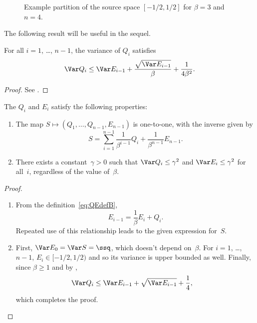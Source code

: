 \begin{figure}
  \begin{center}
    
  \end{center}
  \caption{Example partition of the source space $[-1/2,1/2]$ for $\beta = 3$
  and $n = 4$. }
  \label{fig:sourcepartition}
\end{figure}


The following result will be useful in the sequel.

\begin{lemma}
  \label{lem:Qvarbound}
  For all $i = 1$, \dots, $n-1$, the variance of $Q_i$ satisfies
  \begin{equation*}
    \Var Q_i \le \Var E_{i-1} + \frac{\sqrt{\Var E_{i-1}}}{\beta} +
    \frac{1}{4\beta^2}.
  \end{equation*}
\end{lemma}

\begin{proof}
  See .
\end{proof}

\begin{proposition}
  \label{prop:qeproperties}
  The $Q_i$ and $E_i$ satisfy the following properties:
\begin{enumerate}
  \item The map $S \mapsto (Q_1, \dots, Q_{n-1}, E_{n-1})$ is one-to-one, with
    the inverse given by
    \begin{equation}
      \label{eq:unwraprec}
      S = \sum_{i=1}^{n-1} \frac{1}{\beta^{i-1}} Q_i + \frac{1}{\beta^{n-1}}
      E_{n-1}.
    \end{equation}

  \item There exists a constant~$\gamma > 0$ such that $\Var Q_i \le \gamma^2$
    and $\Var E_i \le \gamma^2$ for all~$i$, regardless of the value of~$\beta$.
\end{enumerate}
\end{proposition}

\begin{proof}
  \begin{enumerate}
    \item From the definition~\eqref{eq:QEdefB}, 
    \begin{equation}
      \label{eq:reverserec}
      E_{i-1} = \frac{1}{\beta} E_i + Q_i.
    \end{equation}
    Repeated use of this relationship leads to the given expression for~$S$. 

  \item First, $\Var E_0 = \Var S = \ssq$, which doesn't depend
    on~$\beta$. For $i = 1$, \ldots, $n-1$, $E_i \in [-1/2, 1/2)$ and so its
    variance is upper bounded as well. Finally, since $\beta \ge 1$ and by
    , 
    \begin{align*}
      \Var Q_i &\le \Var E_{i-1} + \sqrt{\Var E_{i-1}} + \frac14,
    \end{align*}
    which completes the proof.
  \end{enumerate}
\end{proof}

